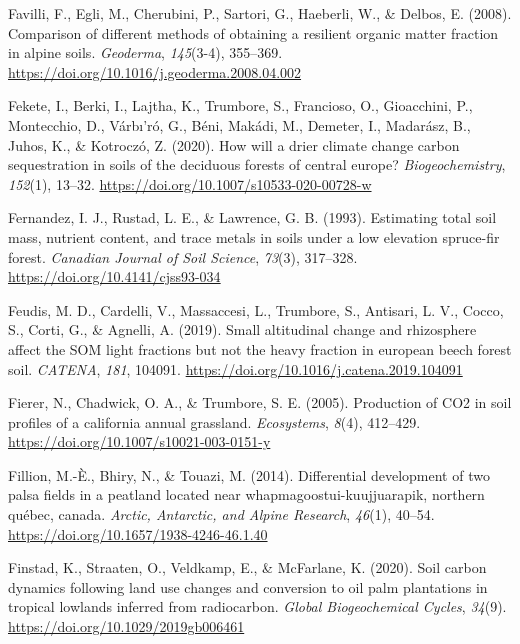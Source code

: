 \documentclass[]{article}
\begin{document}
\leavevmode\hypertarget{ref-Favilli_2008}{}%
Favilli, F., Egli, M., Cherubini, P., Sartori, G., Haeberli, W., \&
Delbos, E. (2008). Comparison of different methods of obtaining a
resilient organic matter fraction in alpine soils. \emph{Geoderma},
\emph{145}(3-4), 355--369.
\url{https://doi.org/10.1016/j.geoderma.2008.04.002}

\leavevmode\hypertarget{ref-Fekete_2020}{}%
Fekete, I., Berki, I., Lajtha, K., Trumbore, S., Francioso, O.,
Gioacchini, P., Montecchio, D., Várbı'ró, G., Béni, Makádi, M., Demeter,
I., Madarász, B., Juhos, K., \& Kotroczó, Z. (2020). How will a drier
climate change carbon sequestration in soils of the deciduous forests of
central europe? \emph{Biogeochemistry}, \emph{152}(1), 13--32.
\url{https://doi.org/10.1007/s10533-020-00728-w}

\leavevmode\hypertarget{ref-Fernandez_1993}{}%
Fernandez, I. J., Rustad, L. E., \& Lawrence, G. B. (1993). Estimating
total soil mass, nutrient content, and trace metals in soils under a low
elevation spruce-fir forest. \emph{Canadian Journal of Soil Science},
\emph{73}(3), 317--328. \url{https://doi.org/10.4141/cjss93-034}

\leavevmode\hypertarget{ref-De_Feudis_2019}{}%
Feudis, M. D., Cardelli, V., Massaccesi, L., Trumbore, S., Antisari, L.
V., Cocco, S., Corti, G., \& Agnelli, A. (2019). Small altitudinal
change and rhizosphere affect the SOM light fractions but not the heavy
fraction in european beech forest soil. \emph{CATENA}, \emph{181},
104091. \url{https://doi.org/10.1016/j.catena.2019.104091}

\leavevmode\hypertarget{ref-Fierer_2005}{}%
Fierer, N., Chadwick, O. A., \& Trumbore, S. E. (2005). Production of
CO2 in soil profiles of a california annual grassland.
\emph{Ecosystems}, \emph{8}(4), 412--429.
\url{https://doi.org/10.1007/s10021-003-0151-y}

\leavevmode\hypertarget{ref-Fillion_2014}{}%
Fillion, M.-È., Bhiry, N., \& Touazi, M. (2014). Differential
development of two palsa fields in a peatland located near
whapmagoostui-kuujjuarapik, northern québec, canada. \emph{Arctic,
Antarctic, and Alpine Research}, \emph{46}(1), 40--54.
\url{https://doi.org/10.1657/1938-4246-46.1.40}

\leavevmode\hypertarget{ref-Finstad_2020}{}%
Finstad, K., Straaten, O., Veldkamp, E., \& McFarlane, K. (2020). Soil
carbon dynamics following land use changes and conversion to oil palm
plantations in tropical lowlands inferred from radiocarbon. \emph{Global
Biogeochemical Cycles}, \emph{34}(9).
\url{https://doi.org/10.1029/2019gb006461}
\end{document}
